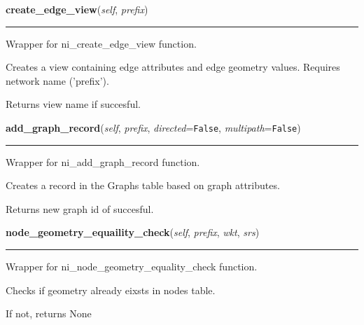 \hspace{.8\funcindent}\begin{boxedminipage}{\funcwidth}

    \raggedright \textbf{create\_edge\_view}(\textit{self}, \textit{prefix})

    \vspace{-1.5ex}

    \rule{\textwidth}{0.5\fboxrule}
\setlength{\parskip}{2ex}
    Wrapper for ni\_create\_edge\_view function.

    Creates a view containing edge attributes and edge geometry values. 
    Requires network name ('prefix').

    Returns view name if succesful.

\setlength{\parskip}{1ex}
    \end{boxedminipage}

    \label{nx_pgnet:nisql:add_graph_record}

    \vspace{0.5ex}

\hspace{.8\funcindent}\begin{boxedminipage}{\funcwidth}

    \raggedright \textbf{add\_graph\_record}(\textit{self}, \textit{prefix}, \textit{directed}={\tt False}, \textit{multipath}={\tt False})

    \vspace{-1.5ex}

    \rule{\textwidth}{0.5\fboxrule}
\setlength{\parskip}{2ex}
    Wrapper for ni\_add\_graph\_record function.

    Creates a record in the Graphs table based on graph attributes.

    Returns new graph id of succesful.

\setlength{\parskip}{1ex}
    \end{boxedminipage}

    \label{nx_pgnet:nisql:node_geometry_equaility_check}

    \vspace{0.5ex}

\hspace{.8\funcindent}\begin{boxedminipage}{\funcwidth}

    \raggedright \textbf{node\_geometry\_equaility\_check}(\textit{self}, \textit{prefix}, \textit{wkt}, \textit{srs})

    \vspace{-1.5ex}

    \rule{\textwidth}{0.5\fboxrule}
\setlength{\parskip}{2ex}
    Wrapper for ni\_node\_geometry\_equality\_check function.

    Checks if geometry already eixsts in nodes table.

    If not, returns None

\setlength{\parskip}{1ex}
    \end{boxedminipage}

